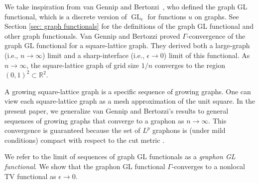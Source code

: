 \documentclass[11pt]{amsart}
\def\R{\mathbb{R}}
\def\ep{\epsilon}
\def\ra{\rightarrow}
\def\GL{\operatorname{GL}}
\numberwithin{equation}{section}
\begin{document}
We take inspiration from van Gennip and Bertozzi~\cite{van2012gamma}, who defined the graph GL functional, which is a discrete version of $\GL_\ep$ for functions $u$ on graphs. See Section \ref{sec: graph functionals} for the definitions of the graph GL functional and other graph functionals. Van Gennip and Bertozzi proved $\Gamma$-convergence of the graph GL functional for a square-lattice graph. They derived both a large-graph (i.e., $n \ra \infty$) limit and a sharp-interface (i.e., $\ep \ra 0$) limit of this functional. As $n \ra \infty$, the square-lattice graph of grid size $1/n$ converges to the region $(0,1)^2 \subset \R^2$. 

A growing square-lattice graph is a specific sequence of growing graphs. One can view each square-lattice graph as a mesh approximation of the unit square. In the present paper, we generalize van Gennip and Bertozzi's results to general sequences of growing graphs that converge to a graphon as $n\ra \infty$. This convergence is guaranteed because the set of $L^p$ graphons is (under mild conditions) compact with respect to the cut metric \cite[Theorem 2.8]{borgs2019LpI}.

We refer to the limit of sequences of graph GL functionals as a \emph{graphon GL functional}. We show that the graphon GL functional $\Gamma$-converges to a nonlocal TV functional as $\ep \ra 0$. 
\end{document}
